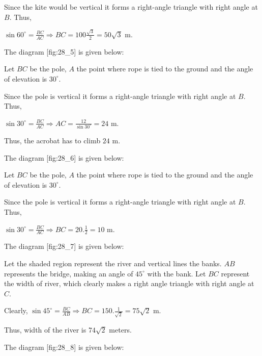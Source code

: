   Since the kite would be vertical it forms a right-angle triangle with right angle at $B$. Thus,

  $\sin60^\circ = \frac{BC}{AC} \Rightarrow BC = 100\frac{\sqrt{3}}{2}= 50\sqrt{3}$ m.

\item The diagram [fig:28_5] is given below:

  \startplacefigure[reference=fig:28_5]
    \externalfigure[28_5.pdf]
  \stopplacefigure

  Let $BC$ be the pole, $A$ the point where rope is tied to the ground and the angle of elevation is $30^\circ$.

  Since the pole is vertical it forms a right-angle triangle with right angle at $B$. Thus,

  $\sin30^\circ = \frac{BC}{AC} \Rightarrow AC = \frac{12}{\sin30^\circ} = 24$ m.

  Thus, the acrobat has to climb $24$ m.

\item The diagram [fig:28_6] is given below:

  \startplacefigure[reference=fig:28_6]
    \externalfigure[28_6.pdf]
  \stopplacefigure

  Let $BC$ be the pole, $A$ the point where rope is tied to the ground and the angle of elevation is $30^\circ$.

  Since the pole is vertical it forms a right-angle triangle with right angle at $B$. Thus,

  $\sin30^\circ = \frac{BC}{AC} \Rightarrow BC = 20.\frac{1}{2} = 10$ m.

\item The diagram [fig:28_7] is given below:

  \startplacefigure[reference=fig:28_7]
    \externalfigure[28_7.pdf]
  \stopplacefigure

  Let the shaded region represent the river and vertical lines the banks. $AB$ represents the bridge, making an angle of
  $45^\circ$ with the bank. Let $BC$ represent the width of river, which clearly makes a right angle triangle with
  right angle at $C$.

  Clearly, $\sin45^\circ = \frac{BC}{AB} \Rightarrow BC = 150.\frac{1}{\sqrt{2}} = 75\sqrt{2}$ m.

  Thus, width of the river is $74\sqrt{2}$ meters.

\item The diagram [fig:28_8] is given below:

